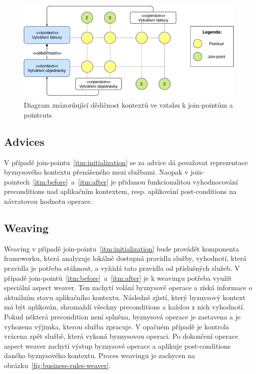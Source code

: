 \begin{figure}
    \centering
    \includegraphics[keepaspectratio=true, width=1\linewidth]{figures/context-extension.pdf}
    \caption{Diagram znázorňující dědičnost kontextů ve vztahu k join-pointům a pointcuts}
    \label{fig:context-extension}
\end{figure}

\subsection{Advices}

V případě join-pointu~\ref{itm:initialization} se za advice dá považovat reprezentace byznysového
kontextu přenášeného mezi službami. Naopak v join-pointech~\ref{itm:before}~a~\ref{itm:after}
je přidanou funkcionalitou vyhodnocování preconditions nad aplikačním kontextem, resp. aplikování
post-conditions na návratovou hodnotu operace.

\subsection{Weaving}

Weaving v případě join-pointu~\ref{itm:initialization} bude provádět komponenta frameworku, která
analyzuje lokálně dostupná pravidla služby, vyhodnotí, která pravidla je potřeba stáhnout,
a vyžádá tato pravidla od příslušných služeb.
V případě join-pointů~\ref{itm:before}~a~\ref{itm:after} je k weavingu potřeba využít speciální aspect
weaver. Ten zachytí volání byznysové operace a získá informace o aktuálním stavu aplikačního kontextu.
Následně zjistí, který byznysový kontext má být aplikován, shromaždí všechny preconditions
a každou z nich vyhodnotí. Pokud některá precondition není splněna, byznysová operace je zastavena
a je vyhozena výjimka, kterou služba zpracuje. V opačném případě je kontrola vrácena zpět
službě, která vykoná byznysovou operaci. Po dokončení operace aspect weaver zachytí výstup byznysové
operace a aplikuje post-conditions daného byznysového kontextu. Proces weavingu je zachycen na
obrázku~\ref{fig:business-rules-weaver}.

